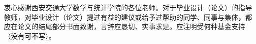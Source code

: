 \begin{mythanks}
衷心感谢西安交通大学数学与统计学院的各位老师。对于毕业设计（论文）的指导教师，对毕业设计（论文）提过有益的建议或给予过帮助的同学、同事与集体，都应在论文的结尾部分书面致谢，言辞应恳切、实事求是。应注明受何种基金支持（没有可不写）。
\end{mythanks}